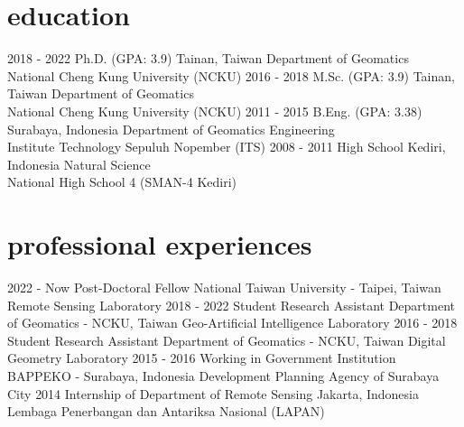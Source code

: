\documentclass[icon]{mycvtemplate}
\begin{document}
\section{education}

\begin{TableTemplate}
  \TableTemplateItem
    {2018 - 2022}
    {Ph.D. (GPA: 3.9)}
    {Tainan, Taiwan}
    {Department of Geomatics\\ National Cheng Kung University (NCKU)}
  \TableTemplateItem
    {2016 - 2018}
    {M.Sc. (GPA: 3.9)}
    {Tainan, Taiwan}
    {Department of Geomatics\\ National Cheng Kung University (NCKU)}
  \TableTemplateItem
    {2011 - 2015}
    {B.Eng. (GPA: 3.38)}
    {Surabaya, Indonesia}
    {Department of Geomatics Engineering\\ Institute Technology Sepuluh Nopember (ITS)}
  \TableTemplateItem
    {2008 - 2011}
    {High School}
    {Kediri, Indonesia}
    {Natural Science\\ National High School 4 (SMAN-4 Kediri)}
\end{TableTemplate}


\section{professional experiences}
\begin{TableTemplate}
  \TableTemplateItem
    {2022 - Now}
    {Post-Doctoral Fellow}
    {National Taiwan University - Taipei, Taiwan}
    {Remote Sensing Laboratory}
  \TableTemplateItem
    {2018 - 2022}
    {Student Research Assistant}
    {Department of Geomatics - NCKU, Taiwan}
    {Geo-Artificial Intelligence Laboratory}
  \TableTemplateItem
    {2016 - 2018}
    {Student Research Assistant}
    {Department of Geomatics - NCKU, Taiwan}
    {Digital Geometry Laboratory}
\TableTemplateItem
    {2015 - 2016}
    {Working in Government Institution}
    {BAPPEKO - Surabaya, Indonesia}
    {Development Planning Agency of Surabaya City}
\TableTemplateItem
    {2014}
    {Internship of Department of Remote Sensing}
    {Jakarta, Indonesia}
    {Lembaga Penerbangan dan Antariksa Nasional (LAPAN)}
\end{TableTemplate}
\end{document}
